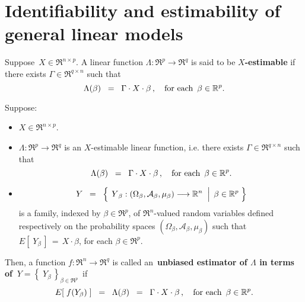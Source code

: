 

\section{Identifiability and estimability of general linear models}
\setcounter{theorem}{0}
\setcounter{equation}{0}

\renewcommand{\theenumi}{\roman{enumi}}
\renewcommand{\labelenumi}{\textnormal{(\theenumi)}$\;\;$}


\begin{definition}
\mbox{}\vskip 0.1cm\noindent
Suppose \,$X \in \Re^{n \times p}$.
A linear function $\Lambda : \Re^{p} \longrightarrow \Re^{q}$ is said to be \textbf{$X$-estimable}
if there exists $\Gamma \in \Re^{q \times n}$ such that
\begin{equation*}
\Lambda(\beta) \;\; =\;\; \Gamma \cdot X \cdot \beta\,,
\quad
\textnormal{for each \,$\beta \in \Re^{p}$}.
\end{equation*}
\end{definition}

\begin{definition}
\mbox{}\vskip 0.1cm\noindent
Suppose:
\begin{itemize}
\item
	$X \in \Re^{n \times p}$.
\item
	$\Lambda : \Re^{p} \longrightarrow \Re^{q}$ is an $X$-estimable linear function, i.e.
	there exists $\Gamma \in \Re^{q \times n}$ such that
	\begin{equation*}
	\Lambda(\beta) \;\; =\;\; \Gamma \cdot X \cdot \beta\,,
	\quad
	\textnormal{for each \,$\beta \in \Re^{p}$}.
	\end{equation*}
\item
	\begin{equation*}
	Y
	\;\; = \;\;
		\left\{\;
		\left.
		\overset{{\color{white}.}}{Y}_{\beta} : (\Omega_{\beta},\mathcal{A}_{\beta},\mu_{\beta}) \longrightarrow \Re^{n}
		\;\;\right\vert\;
		\beta \in \Re^{p}
		\;\right\}
	\end{equation*}
	is a family, indexed by $\beta \in \Re^{p}$,
	of $\Re^{n}$-valued random variables defined respectively on the 
	probability spaces $(\Omega_{\beta},\mathcal{A}_{\beta},\mu_{\beta})$ 
	such that $E\!\left[\;Y_{\beta}\,\right] \,=\, X \cdot \beta$, for each $\beta \in \Re^{p}$.
\end{itemize}
Then,
a function $f : \Re^{n} \longrightarrow \Re^{q}$ is called an
\,{\color{red}\textbf{unbiased estimator of $\Lambda$ in terms of \,$Y = \left\{\;Y_{\beta}\,\right\}_{\beta\in\Re^{p}}$}}\,
if
\begin{equation*}
E\!\left[\;f(Y_{\beta})\;\right] \;\; =\;\; \Lambda(\beta) \;\;=\;\; \Gamma \cdot X \cdot \beta\,,
\quad
\textnormal{for each \,$\beta \in \Re^{p}$}.
\end{equation*}
\end{definition}

